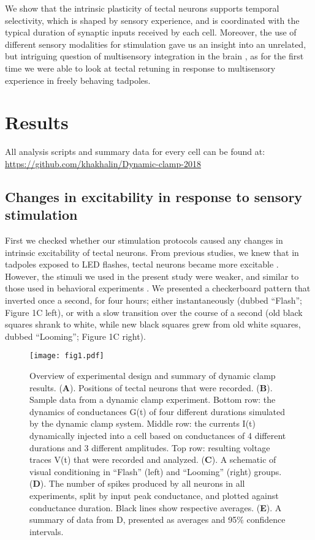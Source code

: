 \documentclass{article}
\begin{document}
We show that the intrinsic plasticity of tectal neurons supports temporal selectivity, which is shaped by sensory experience, and is coordinated with the typical duration of synaptic inputs received by each cell. Moreover, the use of different sensory modalities for stimulation gave us an insight into an unrelated, but intriguing question of multisensory integration in the brain \citep{deeg2009,felch2016,truszkowski2017}, as for the first time we were able to look at tectal retuning in response to multisensory experience in freely behaving tadpoles.


\section*{Results}

All analysis scripts and summary data for every cell can be found at:  \url{https://github.com/khakhalin/Dynamic-clamp-2018}

\subsection*{Changes in excitability in response to sensory stimulation}

First we checked whether our stimulation protocols caused any changes in intrinsic excitability of tectal neurons. From previous studies, we knew that in tadpoles exposed to LED flashes, tectal neurons became more excitable \citep{aizenman2003,ciarleglio2015}. However, the stimuli we used in the present study were weaker, and similar to those used in behavioral experiments \citep{khakhalin2014,james2015,truszkowski2017}. We presented a checkerboard pattern that inverted once a second, for four hours; either instantaneously (dubbed “Flash”; Figure 1C left), or with a slow transition over the course of a second (old black squares shrank to white, while new black squares grew from old white squares, dubbed “Looming”; Figure 1C right).

\begin{figure*}
\texttt{[image: fig1.pdf]}
\caption{
Overview of experimental design and summary of dynamic clamp results. (\textbf{A}). Positions of tectal neurons that were recorded. (\textbf{B}). Sample data from a dynamic clamp experiment. Bottom row: the dynamics of conductances G(t) of four different durations simulated by the dynamic clamp system. Middle row: the currents I(t) dynamically injected into a cell based on conductances of 4 different durations and 3 different amplitudes. Top row: resulting voltage traces V(t) that were recorded and analyzed. (\textbf{C}). A schematic of visual conditioning in “Flash” (left) and “Looming” (right) groups. (\textbf{D}). The number of spikes produced by all neurons in all experiments, split by input peak conductance, and plotted against conductance duration. Black lines show respective averages. (\textbf{E}). A summary of data from D, presented as averages and 95\% confidence intervals.}
\end{figure*}
\end{document}
